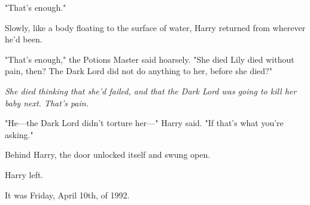 "That's enough."

Slowly, like a body floating to the surface of water, Harry returned from
wherever he'd been.

"That's enough," the Potions Master said hoarsely. "She died{\el} Lily died
without pain, then? The Dark Lord{\el} did not do anything to her, before
she died?"

\emph{She died thinking that she'd failed, and that the Dark Lord was going to
kill her baby next. That's pain.}

"He---the Dark Lord didn't torture her\mbox{---}" Harry said. "If that's what you're
asking."

Behind Harry, the door unlocked itself and swung open.

Harry left.

It was Friday, April 10th, of 1992.
